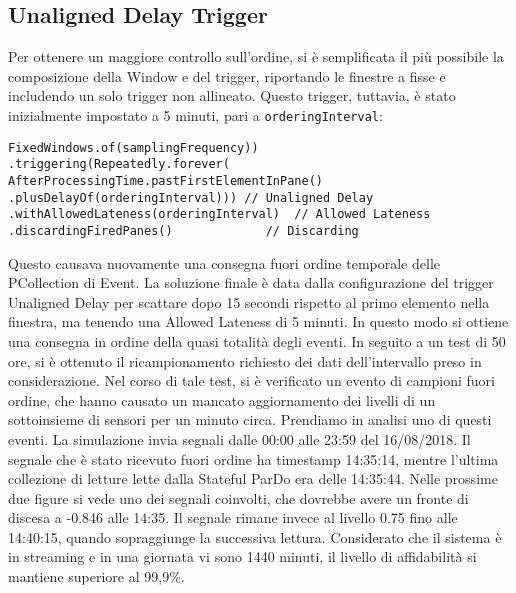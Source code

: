 \subsection{Unaligned Delay Trigger}\label{finaltrigger}
Per ottenere un maggiore controllo sull'ordine, si è semplificata il più possibile la composizione della Window e del trigger, riportando le finestre a fisse e includendo un solo trigger non allineato. Questo trigger, tuttavia, è stato inizialmente impostato a 5 minuti, pari a \texttt{orderingInterval}:
\begin{lstlisting}
FixedWindows.of(samplingFrequency))
.triggering(Repeatedly.forever(
AfterProcessingTime.pastFirstElementInPane()
.plusDelayOf(orderingInterval))) // Unaligned Delay
.withAllowedLateness(orderingInterval)  // Allowed Lateness
.discardingFiredPanes()             // Discarding
\end{lstlisting}
Questo causava nuovamente una consegna fuori ordine temporale delle PCollection di Event. La soluzione finale è data dalla configurazione del trigger Unaligned Delay per scattare dopo 15 secondi rispetto al primo elemento nella finestra, ma tenendo una Allowed Lateness di 5 minuti. In questo modo si ottiene una consegna in ordine della quasi totalità degli eventi. In seguito a un test di 50 ore, si è ottenuto il ricampionamento richiesto dei dati dell'intervallo preso in considerazione.
Nel corso di tale test, si è verificato un evento di campioni fuori ordine, che hanno causato un mancato aggiornamento dei livelli di un sottoinsieme di sensori per un minuto circa. Prendiamo in analisi uno di questi eventi.
La simulazione invia segnali dalle 00:00 alle 23:59 del 16/08/2018. Il segnale che è stato ricevuto fuori ordine ha timestamp 14:35:14, mentre l'ultima collezione di letture lette dalla Stateful ParDo era delle 14:35:44. Nelle prossime due figure si vede uno dei segnali coinvolti, che dovrebbe avere un fronte di discesa a -0.846 alle 14:35. Il segnale rimane invece al livello 0.75 fino alle 14:40:15, quando sopraggiunge la successiva lettura.
Considerato che il sistema è in streaming e in una giornata vi sono 1440 minuti, il livello di affidabilità si mantiene superiore al 99,9\%.
